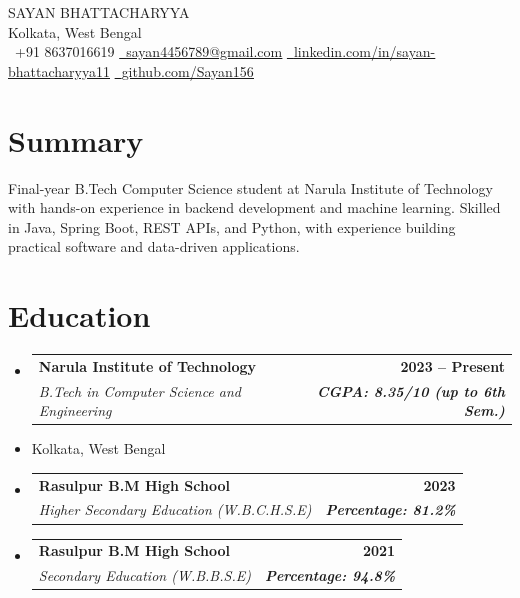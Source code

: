 \documentclass[letterpaper,11pt]{article}
\makeatletter
\newcommand{\resumeItem}[1]{
  \item\small{
    {#1 \vspace{-2pt}}
  }
}
\newcommand{\resumeSubheading}[4]{
  \vspace{-2pt}\item
    \begin{tabular*}{1.0\textwidth}[t]{l@{\extracolsep{\fill}}r}
      \textbf{#1} & \textbf{\small #2} \\
      \textit{\small#3} & \textit{\small #4} \\
    \end{tabular*}\vspace{-7pt}
}
\newcommand{\resumeSubItem}[1]{\resumeItem{#1}\vspace{-4pt}}
\newcommand{\resumeSubHeadingListStart}{
    \begin{itemize}[leftmargin=0.0in, label={}]
}
\newcommand{\resumeSubHeadingListEnd}{
    \end{itemize}
}
\makeatother
\begin{document}
\begin{center}
    {\Huge \scshape SAYAN BHATTACHARYYA} \\ \vspace{4pt}
    Kolkata, West Bengal \\ \vspace{4pt}
    \small
    \raisebox{-0.1\height}{\faPhone}\ +91 8637016619 \quad
    \href{mailto:sayan4456789@gmail.com}
    {\raisebox{-0.1\height}{\faEnvelope}\ \underline{sayan4456789@gmail.com}} \quad
    \href{https://www.linkedin.com/in/sayan-bhattacharyya11/}
    {\raisebox{-0.1\height}{\faLinkedin}\ \underline{linkedin.com/in/sayan-bhattacharyya11}} \quad
    \href{https://github.com/Sayan156}
    {\raisebox{-0.1\height}{\faGithub}\ \underline{github.com/Sayan156}}
\end{center}
\vspace{-6pt}
\vspace{-6pt}

\section{Summary}
\small{
Final-year B.Tech Computer Science student at Narula Institute of Technology with hands-on experience in backend development and machine learning. Skilled in Java, Spring Boot, REST APIs, and Python, with experience building practical software and data-driven applications.


}


\section{Education}
  \resumeSubHeadingListStart

 \resumeSubheading
  {Narula Institute of Technology}{2023 -- Present}
  {B.Tech in Computer Science and Engineering}{\textbf{CGPA: 8.35/10 (up to 6th Sem.)}}
  \resumeSubItem{Kolkata, West Bengal}
  \vspace{5pt}

    \resumeSubheading
      {Rasulpur B.M High School}{2023}
      {Higher Secondary Education (W.B.C.H.S.E)}{\textbf{Percentage: 81.2\%}}
      \vspace{5pt}

    \resumeSubheading
      {Rasulpur B.M High School}{2021}
      {Secondary Education (W.B.B.S.E)}{\textbf{Percentage: 94.8\%}}

  \resumeSubHeadingListEnd
\vspace{-10pt}
\end{document}
